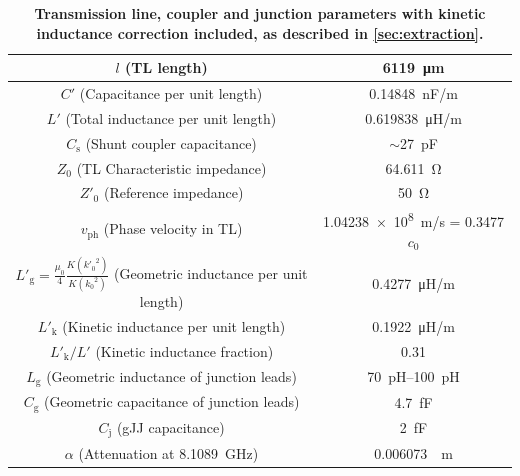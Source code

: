 \begin{table}
	\begin{center}
		\begin{tabular}{|c|c|}
			\hline 
			$l$ (TL length) & \SI{6119}{\micro\meter} \\ 
			\hline 
			$C'$ (Capacitance per unit length) & \SI{0.14848}{nF/m} \\ 
			\hline 
			$L'$ (Total inductance per unit length) & \SI{0.619838}{\micro\henry/m} \\ 
			\hline
			$C_\text{s}$ (Shunt coupler capacitance) & $\sim$\SI{27}{pF} \\ 
			\hline 
			$Z_0$ (TL Characteristic impedance) & \SI{64.611}{\ohm} \\
			\hline 
			$Z'_0$ (Reference impedance) & \SI{50}{\ohm} \\
			\hline 
			$v_\text{ph}$ (Phase velocity in TL) & \SI{1.04238e8}{m/s} = 0.3477 $c_0$ \\ 
			\hline
			$L'_\text{g} = \frac{\mu_0}{4}\frac{K({k'_0}^2)}{K({k_0}^2)}$ (Geometric inductance per unit length) & \SI{0.4277}{\micro\henry/m} \\ 
			\hline
			$L'_\text{k}$ (Kinetic inductance per unit length) & \SI{0.1922}{\micro\henry/m} \\ 
			\hline
			$L'_\text{k}/L'$ (Kinetic inductance fraction) & \num{0.31} \\ 
			\hline
			$L_\text{g}$ (Geometric inductance of junction leads) & \SIrange[range-phrase=--]{70}{100}{pH} \\ 
			\hline
			$C_\text{g}$ (Geometric capacitance of junction leads) & \SI{4.7}{fF} \\ 
			\hline
			$C_\text{j}$ (gJJ capacitance) & \SI{2}{fF} \\ 
			\hline
			$\alpha$ (Attenuation at \SI{8.1089}{\giga\hertz}) & \SI{0.006073}{\per\metre} \\ 
			\hline
		\end{tabular}
		\caption{\bf Transmission line, coupler and junction parameters with kinetic inductance correction included, as described in \ref{sec:extraction}.}
		\label{tab:tlpars}
	\end{center}
\end{table}





